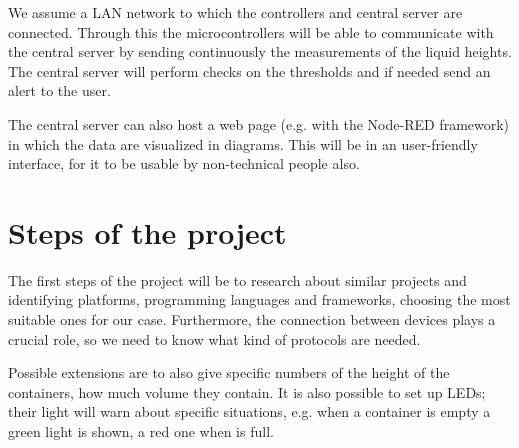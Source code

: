 \documentclass{article}
\begin{document}
We assume a LAN network to which the controllers and central
server are connected. Through this the microcontrollers will be able to communicate with the
central server by sending continuously the measurements of the liquid heights. 
The central server will perform checks on the thresholds and if needed send an alert to the user. 

The central server can also host a web page (e.g. with the Node-RED framework) in which the data are visualized in diagrams. 
This will be in an user-friendly interface, for it to be usable by non-technical people also.

\section{Steps of the project}

The first steps of the project will be to research about similar projects and
identifying platforms, programming languages and frameworks, choosing
the most suitable ones for our case.
Furthermore, the connection between devices
plays a crucial role, so we need to know what kind of protocols are needed.

Possible extensions are to also give specific numbers of the height of the
containers, how much volume they contain.
It is also possible to set up LEDs; their light will warn about specific
situations, e.g. when a container is empty a green light is shown, a red one when
is full.

\end{document}

